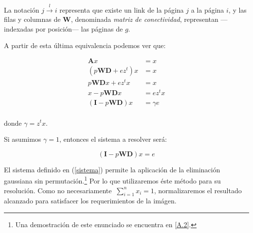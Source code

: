 \noindent La notación $j \stackrel{l}{\longrightarrow} i$ representa que existe un link de la página $j$ a la página $i$, y las filas y columnas de $\textbf{W}$, denominada \textit{matriz de conectividad}, representan ---indexadas por posición--- las páginas de $g$.
\vspace{1em}

\noindent A partir de esta última equivalencia podemos ver que:

\begin{align*}
    \textbf{A}x &= x \\
    (p\textbf{W}\textbf{D} + ez^t)x &= x \\
    p\textbf{W}\textbf{D}x + ez^tx &= x \\
    x - p\textbf{W}\textbf{D}x &= ez^tx \\
    (\textbf{I} - p\textbf{W}\textbf{D})x &= \gamma e \\
\end{align*}

\noindent donde $\gamma = z^tx$.
\vspace{1em}

\noindent Si asumimos $\gamma = 1$, entonces el sistema a resolver será:
\vspace{1em}

\begin{equation}\label{sistema}
    (\textbf{I} - p\textbf{W}\textbf{D})x = e
\end{equation}
\vspace{1em}

El sistema definido en (\ref{sistema}) permite la aplicación de la eliminación gaussiana sin permutación.\footnote{Una demostración de este enunciado se encuentra en \ref{A.2}.} Por lo que utilizaremos éste método para su resolución. Como no necesariamente $\ \sum_{i=1}^{n}{x_i} = 1$, normalizaremos el resultado alcanzado para satisfacer los requerimientos de la imágen.
